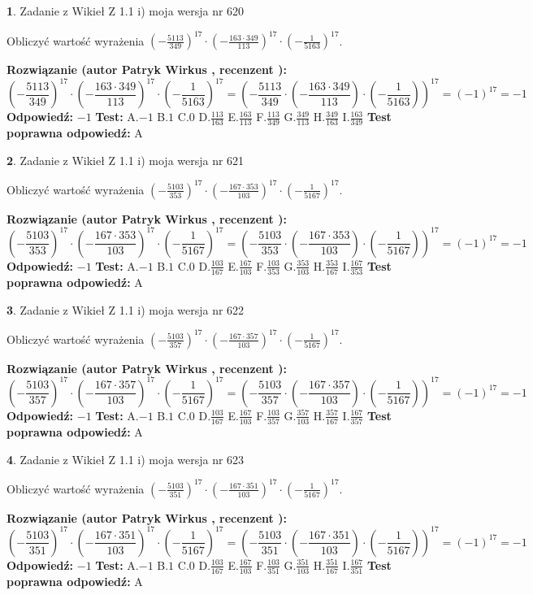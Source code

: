 \documentclass[12pt, a4paper]{article}
\theoremstyle{definition} %
\newtheorem{zad}{}
\newcommand{\zadStart}[1]{\begin{zad}#1\newline}
\newcommand{\zadStop}{\end{zad}}
\newcommand{\rozwStart}[2]{\noindent \textbf{Rozwiązanie (autor #1 , recenzent #2): }\newline}
\newcommand{\rozwStop}{\newline}
\newcommand{\odpStart}{\noindent \textbf{Odpowiedź:}\newline}
\newcommand{\odpStop}{\newline}
\newcommand{\testStart}{\noindent \textbf{Test:}\newline}
\newcommand{\testStop}{\newline}
\newcommand{\kluczStart}{\noindent \textbf{Test poprawna odpowiedź:}\newline}
\newcommand{\kluczStop}{\newline}
\begin{document}
\zadStart{Zadanie z Wikieł Z 1.1 i) moja wersja nr 620}

Obliczyć wartość wyrażenia $(-\frac{5113}{349})^{17} \cdot (-\frac{163 \cdot 349}{113})^{17} \cdot (-\frac{1}{5163})^{17}$.
\zadStop
\rozwStart{Patryk Wirkus}{}
$$(-\frac{5113}{349})^{17} \cdot (-\frac{163 \cdot 349}{113})^{17} \cdot (-\frac{1}{5163})^{17} = (-\frac{5113}{349} \cdot (-\frac{163 \cdot 349}{113}) \cdot (-\frac{1}{5163}))^{17} = (-1)^{17} = -1$$
\rozwStop
\odpStart
$-1$
\odpStop
\testStart
A.$-1$ B.$1$ C.$0$ D.$\frac{113}{163}$ E.$\frac{163}{113}$
F.$\frac{113}{349}$ G.$\frac{349}{113}$
H.$\frac{349}{163}$
I.$\frac{163}{349}$
\testStop
\kluczStart
A
\kluczStop



\zadStart{Zadanie z Wikieł Z 1.1 i) moja wersja nr 621}

Obliczyć wartość wyrażenia $(-\frac{5103}{353})^{17} \cdot (-\frac{167 \cdot 353}{103})^{17} \cdot (-\frac{1}{5167})^{17}$.
\zadStop
\rozwStart{Patryk Wirkus}{}
$$(-\frac{5103}{353})^{17} \cdot (-\frac{167 \cdot 353}{103})^{17} \cdot (-\frac{1}{5167})^{17} = (-\frac{5103}{353} \cdot (-\frac{167 \cdot 353}{103}) \cdot (-\frac{1}{5167}))^{17} = (-1)^{17} = -1$$
\rozwStop
\odpStart
$-1$
\odpStop
\testStart
A.$-1$ B.$1$ C.$0$ D.$\frac{103}{167}$ E.$\frac{167}{103}$
F.$\frac{103}{353}$ G.$\frac{353}{103}$
H.$\frac{353}{167}$
I.$\frac{167}{353}$
\testStop
\kluczStart
A
\kluczStop



\zadStart{Zadanie z Wikieł Z 1.1 i) moja wersja nr 622}

Obliczyć wartość wyrażenia $(-\frac{5103}{357})^{17} \cdot (-\frac{167 \cdot 357}{103})^{17} \cdot (-\frac{1}{5167})^{17}$.
\zadStop
\rozwStart{Patryk Wirkus}{}
$$(-\frac{5103}{357})^{17} \cdot (-\frac{167 \cdot 357}{103})^{17} \cdot (-\frac{1}{5167})^{17} = (-\frac{5103}{357} \cdot (-\frac{167 \cdot 357}{103}) \cdot (-\frac{1}{5167}))^{17} = (-1)^{17} = -1$$
\rozwStop
\odpStart
$-1$
\odpStop
\testStart
A.$-1$ B.$1$ C.$0$ D.$\frac{103}{167}$ E.$\frac{167}{103}$
F.$\frac{103}{357}$ G.$\frac{357}{103}$
H.$\frac{357}{167}$
I.$\frac{167}{357}$
\testStop
\kluczStart
A
\kluczStop



\zadStart{Zadanie z Wikieł Z 1.1 i) moja wersja nr 623}

Obliczyć wartość wyrażenia $(-\frac{5103}{351})^{17} \cdot (-\frac{167 \cdot 351}{103})^{17} \cdot (-\frac{1}{5167})^{17}$.
\zadStop
\rozwStart{Patryk Wirkus}{}
$$(-\frac{5103}{351})^{17} \cdot (-\frac{167 \cdot 351}{103})^{17} \cdot (-\frac{1}{5167})^{17} = (-\frac{5103}{351} \cdot (-\frac{167 \cdot 351}{103}) \cdot (-\frac{1}{5167}))^{17} = (-1)^{17} = -1$$
\rozwStop
\odpStart
$-1$
\odpStop
\testStart
A.$-1$ B.$1$ C.$0$ D.$\frac{103}{167}$ E.$\frac{167}{103}$
F.$\frac{103}{351}$ G.$\frac{351}{103}$
H.$\frac{351}{167}$
I.$\frac{167}{351}$
\testStop
\kluczStart
A
\kluczStop
\end{document}
